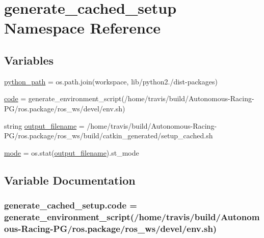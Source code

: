 \hypertarget{namespacegenerate__cached__setup}{}\section{generate\+\_\+cached\+\_\+setup Namespace Reference}
\label{namespacegenerate__cached__setup}
\subsection*{Variables}
\begin{DoxyCompactItemize}
\item 
\hyperlink{namespacegenerate__cached__setup_a72579fd01529a79bab20d99291889d3f}{python\+\_\+path} = os.\+path.\+join(workspace, \textquotesingle{}lib/python2./dist-\/packages\textquotesingle{})
\item 
\hyperlink{namespacegenerate__cached__setup_a52601295006f2366a311c4453d8f2f2e}{code} = generate\+\_\+environment\+\_\+script(\textquotesingle{}/home/travis/build/Autonomous-\/Racing-\/PG/ros.\+package/ros\+\_\+ws/devel/env.\+sh\textquotesingle{})
\item 
string \hyperlink{namespacegenerate__cached__setup_a0265aee5075ee1eb701ff69c98ad6793}{output\+\_\+filename} = \textquotesingle{}/home/travis/build/Autonomous-\/Racing-\/PG/ros.\+package/ros\+\_\+ws/build/catkin\+\_\+generated/setup\+\_\+cached.\+sh\textquotesingle{}
\item 
\hyperlink{namespacegenerate__cached__setup_a10081e5abedae9bd46dd91202096e789}{mode} = os.\+stat(\hyperlink{namespacegenerate__cached__setup_a0265aee5075ee1eb701ff69c98ad6793}{output\+\_\+filename}).st\+\_\+mode
\end{DoxyCompactItemize}


\subsection{Variable Documentation}
\subsubsection[{\texorpdfstring{code}{code}}]{\setlength{\rightskip}{0pt plus 5cm}generate\+\_\+cached\+\_\+setup.\+code = generate\+\_\+environment\+\_\+script(\textquotesingle{}/home/travis/build/Autonomous-\/Racing-\/PG/ros.\+package/ros\+\_\+ws/devel/env.\+sh\textquotesingle{})}\hypertarget{namespacegenerate__cached__setup_a52601295006f2366a311c4453d8f2f2e}{}\label{namespacegenerate__cached__setup_a52601295006f2366a311c4453d8f2f2e}


